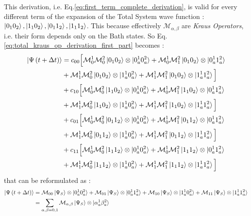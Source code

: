 \documentclass[a4paper,12pt]{article}
\begin{document}
This derivation, i.e. Eq.\ref{eq:first_term_complete_derivation}, is valid for every different term of the expansion of the Total System wave function : $ \ket{0_{1}0_{2}}, \ket{1_{1}0_{2}}, \ket{0_{1}1_{2}}, \ket{1_{1}1_{2}}  $. This because effectively $ \mathcal{M}_{\alpha, \beta} $ are \textit{Kraus Operators}, i.e. their form depends only on the Bath states. So Eq.\ref{eq:total_kraus_op_derivation_first_part} becomes :
\begin{align}
	\ket{\Psi \left( t + \Delta t\right)} &= c_{00} \Big[ \mathcal{M}_{0}^{1} \mathcal{M}_{0}^{2} \ket{0_{1}0_{2}} \otimes \ket{0_{a}^{1}0_{a}^{2}} + \mathcal{M}_{0}^{1} \mathcal{M}_{1}^{2} \ket{0_{1}0_{2}} \otimes \ket{0_{a}^{1}1_{a}^{2}} \notag \\
	& + \mathcal{M}_{1}^{1} \mathcal{M}_{0}^{2} \ket{0_{1}0_{2}} \otimes \ket{1_{a}^{1}0_{a}^{2}} + \mathcal{M}_{1}^{1} \mathcal{M}_{1}^{2} \ket{0_{1}0_{2}} \otimes \ket{1_{a}^{1}1_{a}^{2}} \Big] \notag \\
	&+ c_{10} \Big[ \mathcal{M}_{0}^{1} \mathcal{M}_{0}^{2} \ket{1_{1}0_{2}} \otimes \ket{0_{a}^{1}0_{a}^{2}} + \mathcal{M}_{0}^{1} \mathcal{M}_{1}^{2} \ket{1_{1}0_{2}} \otimes \ket{0_{a}^{1}1_{a}^{2}} \notag \\
	& + \mathcal{M}_{1}^{1} \mathcal{M}_{0}^{2} \ket{1_{1}0_{2}} \otimes \ket{1_{a}^{1}0_{a}^{2}} + \mathcal{M}_{1}^{1} \mathcal{M}_{1}^{2} \ket{1_{1}0_{2}} \otimes \ket{1_{a}^{1}1_{a}^{2}} \Big] \notag \\
	&+ c_{01} \Big[ \mathcal{M}_{0}^{1} \mathcal{M}_{0}^{2} \ket{0_{1}1_{2}} \otimes \ket{0_{a}^{1}0_{a}^{2}} + \mathcal{M}_{0}^{1} \mathcal{M}_{1}^{2} \ket{0_{1}1_{2}} \otimes \ket{0_{a}^{1}1_{a}^{2}} \notag \\
	& + \mathcal{M}_{1}^{1} \mathcal{M}_{0}^{2} \ket{0_{1}1_{2}} \otimes \ket{1_{a}^{1}0_{a}^{2}} + \mathcal{M}_{1}^{1} \mathcal{M}_{1}^{2} \ket{0_{1}1_{2}} \otimes \ket{1_{a}^{1}1_{a}^{2}} \Big] \notag \\
	&+ c_{11} \Big[ \mathcal{M}_{0}^{1} \mathcal{M}_{0}^{2} \ket{1_{1}1_{2}} \otimes \ket{0_{a}^{1}0_{a}^{2}} + \mathcal{M}_{0}^{1} \mathcal{M}_{1}^{2} \ket{1_{1}1_{2}} \otimes \ket{0_{a}^{1}1_{a}^{2}} \notag \\
	& + \mathcal{M}_{1}^{1} \mathcal{M}_{0}^{2} \ket{1_{1}1_{2}} \otimes \ket{1_{a}^{1}0_{a}^{2}} + \mathcal{M}_{1}^{1} \mathcal{M}_{1}^{2} \ket{1_{1}1_{2}} \otimes \ket{1_{a}^{1}1_{a}^{2}} \Big] \notag
\end{align}
that can be reformulated as :
\begin{align}
	\ket{\Psi \left( t + \Delta t\right)} &= \mathcal{M}_{00} \ket{\Psi_{S}} \otimes \ket{0_{a}^{1}0_{a}^{2}} + \mathcal{M}_{01} \ket{\Psi_{S}} \otimes \ket{0_{a}^{1}1_{a}^{2}} + \mathcal{M}_{10} \ket{\Psi_{S}} \otimes \ket{1_{a}^{1}0_{a}^{2}} + \mathcal{M}_{11} \ket{\Psi_{S}} \otimes \ket{1_{a}^{1}1_{a}^{2}} \notag \\
	& = \sum_{\alpha,\beta = 0,1}{\mathcal{M}_{\alpha, \beta} \ket{\Psi_{S}} \otimes \ket{\alpha_{a}^{1}\beta_{a}^{2}} }
	\label{eq:final_evo_via_total_kraus_op}
\end{align}
\end{document}
